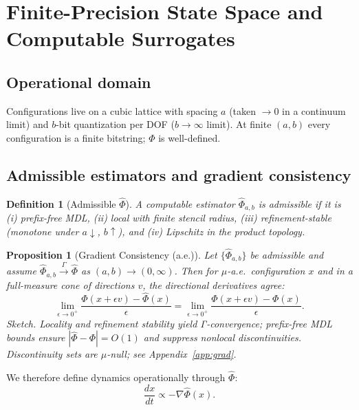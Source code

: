 \documentclass[aps,preprint,onecolumn,longbibliography,nofootinbib]{revtex4-2}
\numberwithin{equation}{section}        %
\newtheorem{definition}{Definition}
\newtheorem{proposition}{Proposition}
\begin{document}
\section{Finite-Precision State Space and Computable Surrogates}
\subsection{Operational domain}
Configurations live on a cubic lattice with spacing $a$ (taken $\to 0$ in a continuum limit) and $b$-bit quantization per DOF ($b\to\infty$ limit). At finite $(a,b)$ every configuration is a finite bitstring; $\Phi$ is well-defined.

\subsection{Admissible estimators and gradient consistency}
\begin{definition}[Admissible $\widehat\Phi$]
A computable estimator $\widehat\Phi_{a,b}$ is \emph{admissible} if it is (i) prefix-free MDL, (ii) local with finite stencil radius, (iii) refinement-stable (monotone under $a\downarrow$, $b\uparrow$), and (iv) Lipschitz in the product topology.
\end{definition}

\begin{proposition}[Gradient Consistency (a.e.)]\label{prop:grad}
Let $\{\widehat\Phi_{a,b}\}$ be admissible and assume $\widehat\Phi_{a,b}\xrightarrow{\Gamma}\widehat\Phi$ as $(a,b)\to (0,\infty)$. Then for $\mu$-a.e.\ configuration $x$ and in a full-measure cone of directions $v$, the directional derivatives agree:
\begin{equation}
\lim_{\epsilon\to 0^+}\frac{\widehat\Phi(x+\epsilon v)-\widehat\Phi(x)}{\epsilon} = \lim_{\epsilon\to 0^+}\frac{\Phi(x+\epsilon v)-\Phi(x)}{\epsilon}.
\end{equation}
\emph{Sketch.} Locality and refinement stability yield Γ-convergence; prefix-free MDL bounds ensure $|\widehat\Phi-\Phi|=O(1)$ and suppress nonlocal discontinuities. Discontinuity sets are $\mu$-null; see Appendix~\ref{app:grad}.
\end{proposition}

We therefore define dynamics operationally through $\widehat\Phi$:
\begin{equation}
\frac{dx}{dt} \propto -\nabla \widehat\Phi(x). \label{eq:dynamics}
\end{equation}
\end{document}
